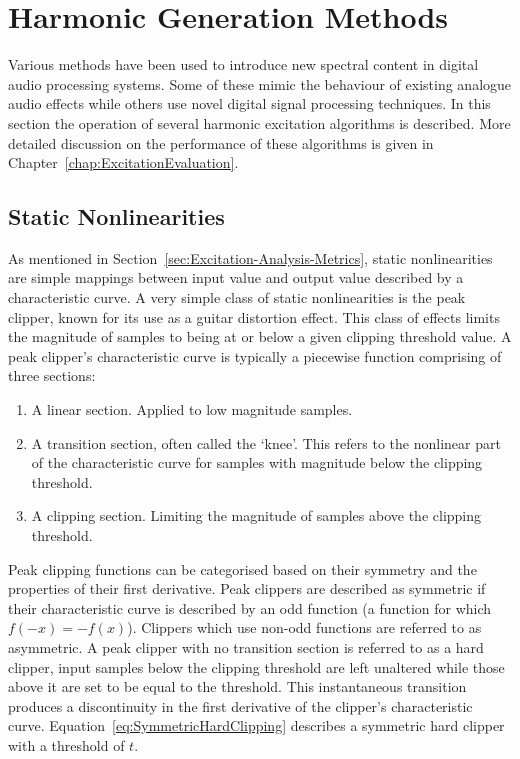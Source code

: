 \section{Harmonic Generation Methods}
\label{sec:Excitation-Methods}
	Various methods have been used to introduce new spectral content in digital audio processing systems.  Some of
	these mimic the behaviour of existing analogue audio effects while others use novel digital signal processing
	techniques. In this section the operation of several harmonic excitation algorithms is described. More detailed
	discussion on the performance of these algorithms is given in Chapter~\ref{chap:ExcitationEvaluation}.

	\subsection{Static Nonlinearities}
	\label{sec:Excitation-Methods-Statics}
		As mentioned in Section~\ref{sec:Excitation-Analysis-Metrics}, static nonlinearities are simple mappings
		between input value and output value described by a characteristic curve. A very simple class of static
		nonlinearities is the peak clipper, known for its use as a guitar distortion effect. This class of effects
		limits the magnitude of samples to being at or below a given clipping threshold value. A peak clipper's
		characteristic curve is typically a piecewise function comprising of three sections:

		\begin{enumerate}
			\item A linear section. Applied to low magnitude samples.
			\item A transition section, often called the `knee'. This refers to the nonlinear part of the
				characteristic curve for samples with magnitude below the clipping threshold.
			\item A clipping section. Limiting the magnitude of samples above the clipping threshold.
		\end{enumerate}
		
		Peak clipping functions can be categorised based on their symmetry and the properties of their first
		derivative. Peak clippers are described as symmetric if their characteristic curve is described by an odd
		function (a function for which $f(-x) = -f(x)$). Clippers which use non-odd functions are referred to as
		asymmetric. A peak clipper with no transition section is referred to as a hard clipper, input samples below
		the clipping threshold are left unaltered while those above it are set to be equal to the threshold. This
		instantaneous transition produces a discontinuity in the first derivative of the clipper's characteristic
		curve. Equation~\ref{eq:SymmetricHardClipping} describes a symmetric hard clipper with a threshold of $t$.

